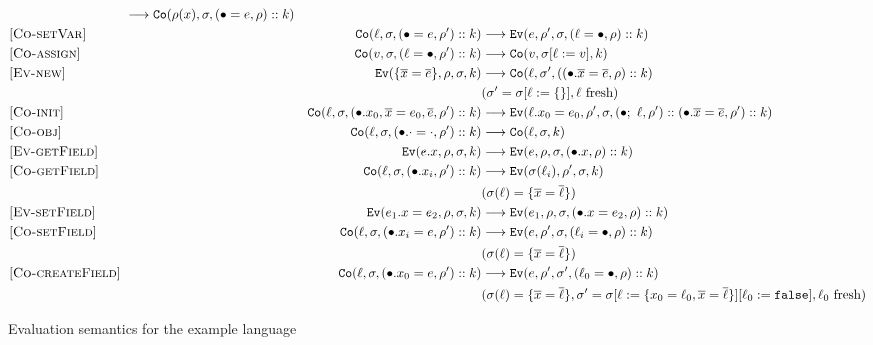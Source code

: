 \begin{figure*}
\begin{center}
\begin{align*}
    & \longrightarrow
    \c{Co}(\rho(x), \sigma, (\bullet = e, \rho)::k)
\\
  \omit [\textsc{Co-setVar}] &&
    \c{Co}(\ell, \sigma, (\bullet = e, \rho')::k)
    & \longrightarrow
    \c{Ev}(e, \rho', \sigma, (\ell = \bullet, \rho)::k)
\\
  \omit [\textsc{Co-assign}] &&
    \c{Co}(v, \sigma, (\ell = \bullet, \rho')::k)
    & \longrightarrow
    \c{Co}(v, \sigma[\ell := v], k)
\\
  \omit [\textsc{Ev-new}] &&
    \c{Ev}(\{ \overline{x} = \overline{e} \}, \rho, \sigma, k)
    & \longrightarrow
    \c{Co}(\ell, \sigma', (\init{\overline{x}}{\overline{e}}{\rho}::k)
        \\ &&& (\sigma' = \sigma[\ell := \c{\{\}}], \ell~\mbox{fresh})
\\
  \omit [\textsc{Co-init}] &&
    \c{Co}(\ell, \sigma, \init{x_0,\overline{x}}{e_0,\overline{e}}{\rho'}::k)
    & \longrightarrow
    \c{Ev}(\ell.x_0 = e_0, \rho', \sigma,
    \then{\ell}{\rho'}::\init{\overline{x}}{\overline{e}}{\rho'}::k)
\\
  \omit [\textsc{Co-obj}] &&
    \c{Co}(\ell, \sigma, \init{\cdot}{\cdot}{\rho'}::k)
    & \longrightarrow
    \c{Co}(\ell, \sigma, k)
\\
  \omit [\textsc{Ev-getField}] &&
    \c{Ev}(e.x, \rho, \sigma, k)
    & \longrightarrow
    \c{Ev}(e, \rho, \sigma, (\bullet.x, \rho)::k)
\\
  \omit [\textsc{Co-getField}] &&
    \c{Co}(\ell, \sigma, (\bullet.x_i, \rho')::k)
    & \longrightarrow
    \c{Ev}(\sigma(\ell_i), \rho', \sigma, k)
        \\ &&& (\sigma(\ell) = \{ \overline{x} = \overline{\ell}\})
\\
  \omit [\textsc{Ev-setField}] &&
    \c{Ev}(e_1.x = e_2, \rho, \sigma, k)
    & \longrightarrow
    \c{Ev}(e_1, \rho, \sigma, (\bullet.x = e_2, \rho)::k)
\\
  \omit [\textsc{Co-setField}] &&
    \c{Co}(\ell, \sigma, (\bullet.x_i = e, \rho')::k)
    & \longrightarrow
    \c{Ev}(e, \rho', \sigma, (\ell_i = \bullet, \rho)::k)
        \\ &&& (\sigma(\ell) = \{ \overline{x} = \overline{\ell}\})
\\
  \omit [\textsc{Co-createField}] &&
    \c{Co}(\ell, \sigma, (\bullet.x_0 = e, \rho')::k)
    & \longrightarrow
    \c{Ev}(e, \rho', \sigma', (\ell_0 = \bullet, \rho)::k)
        \\ &&& (
                \sigma(\ell) = \{ \overline{x} = \overline{\ell} \},
                \sigma' =
                \sigma[\ell := \{ x_0 = \ell_0, \overline{x} = \overline{\ell} \}
                       ][\ell_0 := \c{false}], \ell_0~\mbox{fresh})
\\
\end{align*}
  \end{center}

\caption{Evaluation semantics for the example language}
\label{fig:imp-cesk}
\end{figure*}

